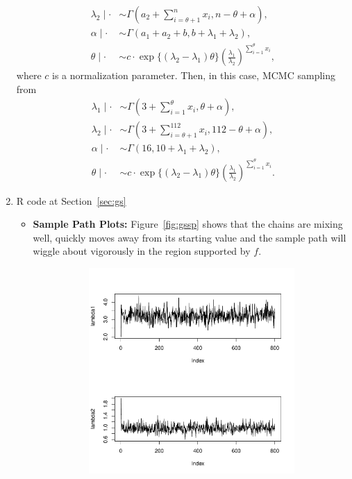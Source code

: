 \documentclass[11pt]{article}
\begin{document}
\begin{enumerate}
\begin{align*}
        \lambda_2 \mid \cdot &\sim \Gamma(a_2+\sum\limits_{i=\theta+1}^{n}x_i,n- \theta+\alpha),\\
        \alpha  \mid \cdot&\sim \Gamma(a_1+a_2+b,b+\lambda_1+\lambda_2),\\
        \theta \mid \cdot&\sim  c\cdot \exp\{(\lambda_2-\lambda_1)\theta\}\left( \frac{\lambda_1}{\lambda_2} \right)^{\sum\limits_{i=1}^{\theta}x_i},
    \end{align*}
    where $c$ is a normalization parameter. Then, in this case, MCMC sampling from
    \begin{align*}
        \lambda_1 \mid \cdot &\sim \Gamma(3+\sum\limits_{i=1}^{\theta}x_i, \theta+\alpha),\\
        \lambda_2 \mid \cdot &\sim \Gamma(3+\sum\limits_{i=\theta+1}^{112}x_i,112- \theta+\alpha),\\
        \alpha  \mid \cdot&\sim \Gamma(16,10+\lambda_1+\lambda_2),\\
        \theta \mid \cdot &\sim c\cdot \exp\{(\lambda_2-\lambda_1)\theta\}\left( \frac{\lambda_1}{\lambda_2} \right)^{\sum\limits_{i=1}^{\theta}x_i}.
    \end{align*}
    \item R code at Section~\ref{sec:gs}
    \begin{itemize}
        \item \textbf{Sample Path Plots: }Figure~\ref{fig:gssp} shows that the chains are mixing well, quickly moves away from its starting value and the sample path will wiggle about vigorously in the region supported by $f$.
        \begin{figure}[!htbp]
            \begin{subfigure}[t]{0.49\textwidth}
                \centering
                \includegraphics[width=\linewidth]{img/gssp-1.pdf}

\end{subfigure}
\end{figure}
\end{itemize}
\end{enumerate}
\end{document}
